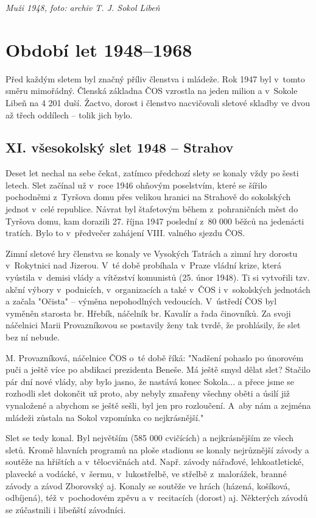 \documentclass[a5paper, 11pt, twoside]{article}
\begin{document}
\textit{Muži 1948, foto: archiv T. J. Sokol Libeň}

\section{Období let 1948--1968}

Před každým sletem byl značný příliv členstva i mládeže. Rok 1947 byl
v~tomto směru mimořádný. Členská základna ČOS vzrostla na jeden milion a
v~Sokole Libeň na 4 201 duší. Žactvo, dorost i členstvo nacvičovali
sletové skladby ve dvou až třech oddílech -- tolik jich bylo.

\subsection{XI. všesokolský slet 1948 -- Strahov}

Deset let nechal na sebe čekat, zatímco předchozí slety se konaly vždy
po šesti letech. Slet začínal už v~roce 1946 ohňovým poselstvím, které
se šířilo pochodněmi z~Tyršova domu přes velikou hranici na Strahově do
sokolských jednot v~celé republice. Návrat byl štafetovým během
z~pohraničních měst do Tyršova domu, kam dorazili 27. října 1947 poslední
z~80 000 běžců na jedenácti tratích. Bylo to v~předvečer zahájení VIII.
valného sjezdu ČOS.

Zimní sletové hry členstva se konaly ve Vysokých Tatrách a zimní hry
dorostu v~Rokytnici nad Jizerou. V~té době probíhala v~Praze vládní
krize, která vyústila v~demisi vlády a vítězství komunistů (25. únor
1948). Ti si vytvořili tzv. akční výbory v~podnicích, v~organizacích a
také v~ČOS i v~sokolských jednotách a začala "Očista" -- výměna
nepohodlných vedoucích. V~ústředí ČOS byl vyměněn starosta br. Hřebík,
náčelník br. Kavalír a řada činovníků. Za svoji náčelnici Marii
Provazníkovou se postavily ženy tak tvrdě, že prohlásily, že slet bez ní
nebude.

M. Provazníková, náčelnice ČOS o~té době říká: "Nadšení pohaslo po
únorovém puči a ještě více po abdikaci prezidenta Beneše. Má ještě smysl
dělat slet? Stačilo pár dní nové vlády, aby bylo jasno, že nastává konec
Sokola... a přece jsme se rozhodli slet dokončit už proto, aby nebyly
zmařeny všechny oběti a úsilí již vynaložené a abychom se ještě sešli,
byl jen pro rozloučení. A~aby nám a zejména mládeži zůstala na Sokol
vzpomínka co nejkrásnější."

Slet se tedy konal. Byl největším (585 000 cvičících) a nejkrásnějším ze
všech sletů. Kromě hlavních programů na ploše stadionu se konaly
nejrůznější závody a soutěže na hřištích a v~tělocvičnách atd. Např.
závody nářaďové, lehkoatletické, plavecké a vodácké, v~šermu,
v~lukostřelbě, ve střelbě z~malorážek, branné závody a závod Zborovský aj.
Konaly se soutěže ve hrách (házená, košíková, odbíjená), též
v~pochodovém zpěvu a v~recitacích (dorost) aj. Některých závodů se
zúčastnili i libeňští závodníci.
\end{document}
